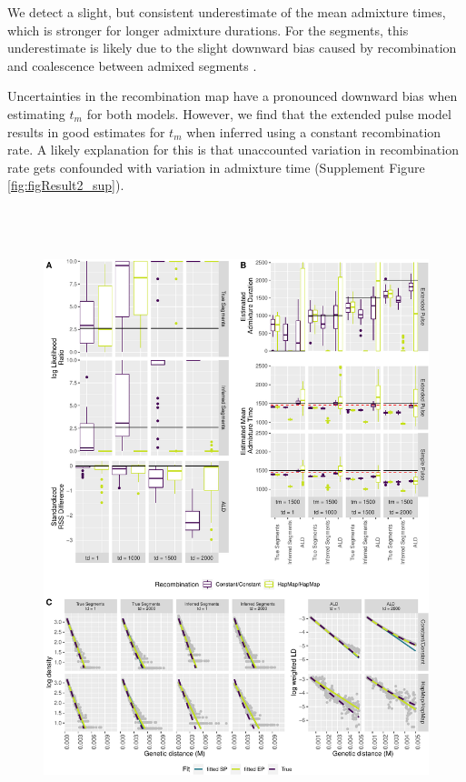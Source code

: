 \documentclass[11pt]{article}
\begin{document}
We detect a slight, but consistent underestimate of the mean admixture times, which is stronger for longer admixture durations. For the segments, this underestimate is likely due to the slight downward bias caused by recombination and coalescence between admixed segments \cite{liang_lengths_2014}. 

Uncertainties in the recombination map have a pronounced downward bias when estimating $t_m$ for both models. However, we find that the extended pulse model results in good estimates for $t_m$ when inferred using a constant recombination rate. A likely explanation for this is that unaccounted variation in recombination rate gets confounded with variation in admixture time (Supplement Figure \ref{fig:figResult2_sup}).




\begin{figure}
\centering
\includegraphics[width=16cm,height=18cm,keepaspectratio]{ATE_Revisions_files/figure-latex/figResult2_all_together-1.pdf}

\end{figure}
\end{document}
